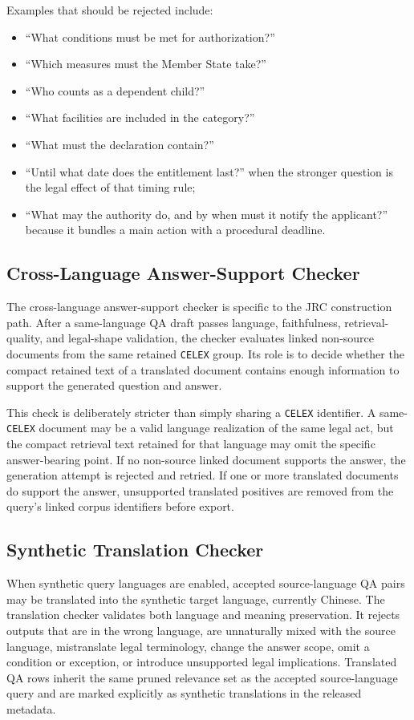Examples that should be rejected include:
\begin{itemize}
\item ``What conditions must be met for authorization?''
\item ``Which measures must the Member State take?''
\item ``Who counts as a dependent child?''
\item ``What facilities are included in the category?''
\item ``What must the declaration contain?''
\item ``Until what date does the entitlement last?'' when the stronger question is the legal effect of that timing rule;
\item ``What may the authority do, and by when must it notify the applicant?'' because it bundles a main action with a procedural deadline.
\end{itemize}

\subsection{Cross-Language Answer-Support Checker}

The cross-language answer-support checker is specific to the JRC construction path. After a same-language QA draft passes language, faithfulness, retrieval-quality, and legal-shape validation, the checker evaluates linked non-source documents from the same retained \texttt{CELEX} group. Its role is to decide whether the compact retained text of a translated document contains enough information to support the generated question and answer.

This check is deliberately stricter than simply sharing a \texttt{CELEX} identifier. A same-\texttt{CELEX} document may be a valid language realization of the same legal act, but the compact retrieval text retained for that language may omit the specific answer-bearing point. If no non-source linked document supports the answer, the generation attempt is rejected and retried. If one or more translated documents do support the answer, unsupported translated positives are removed from the query's linked corpus identifiers before export.

\subsection{Synthetic Translation Checker}

When synthetic query languages are enabled, accepted source-language QA pairs may be translated into the synthetic target language, currently Chinese. The translation checker validates both language and meaning preservation. It rejects outputs that are in the wrong language, are unnaturally mixed with the source language, mistranslate legal terminology, change the answer scope, omit a condition or exception, or introduce unsupported legal implications. Translated QA rows inherit the same pruned relevance set as the accepted source-language query and are marked explicitly as synthetic translations in the released metadata.

